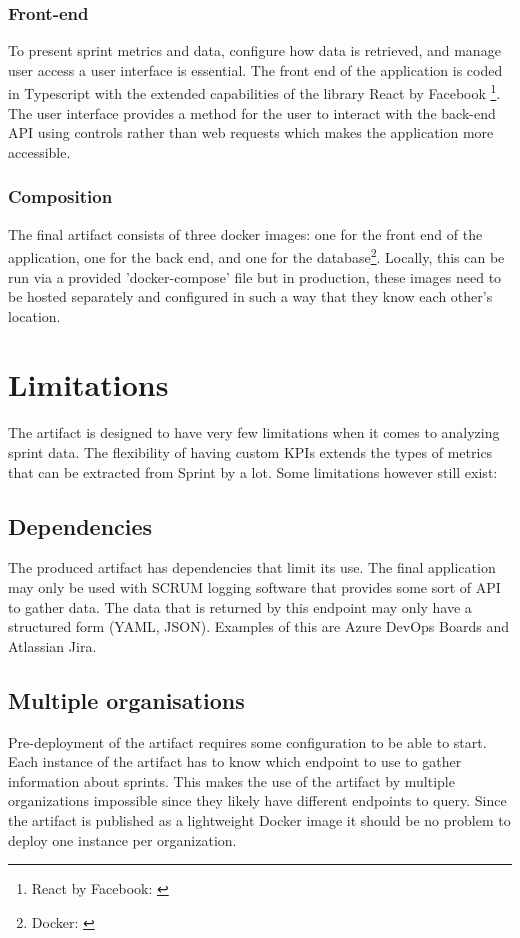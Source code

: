 \subsubsection{Front-end}

To present sprint metrics and data, configure how data is retrieved,
and manage user access a user interface is essential.
The front end of the application is coded in Typescript with the
extended capabilities of the library React by Facebook 
\footnote{React by Facebook: \cite{ReactDev}}. 
The user interface provides a method for the user to interact with the back-end API using controls rather than web requests which makes the application more accessible.  

\subsubsection{Composition}

The final artifact consists of three docker images: 
one for the front end of the application, one for the back end,
and one for the database\footnote{Docker: \cite{DockerGetStarted}}.
Locally, this can be run via a provided 'docker-compose' file but in production,
these images need to be hosted separately and configured in such a 
way that they know each other's location.

\section{Limitations}

The artifact is designed to have very few limitations when it comes to analyzing sprint data. 
The flexibility of having custom KPIs extends the types of metrics that can be extracted 
from Sprint by a lot. Some limitations however still exist:

\subsection*{Dependencies}

The produced artifact has dependencies that limit its use. The final application may only be used with SCRUM logging software that provides some sort of API to gather data. The data that is returned by this endpoint may only have a structured form (YAML, JSON). Examples of this are Azure DevOps Boards and Atlassian Jira.

\subsection*{Multiple organisations}
Pre-deployment of the artifact requires some configuration to be able to start. Each instance of the artifact has to know which endpoint to use to gather information about sprints. This makes the use of the artifact by multiple organizations impossible since they likely have different endpoints to query. Since the artifact is published as a lightweight Docker image it should be no problem to deploy one instance per organization. 

